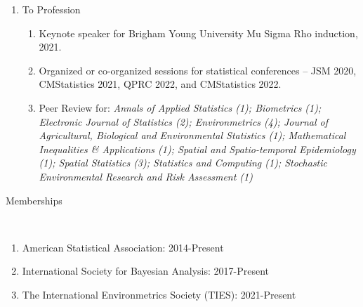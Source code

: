 \documentclass[11pt]{article}
\newcommand{\head}[1]{ %
    \bigskip %
    \begin{large}\begin{bf}{#1}\end{bf}\end{large} %

    \ \\ [-1.3cm] %

    \hrulefill}
\begin{document}
\begin{enumerate}[label=$\bullet$]
\begin{enumerate}[label=$\cdot$]
\end{enumerate}

\item To Profession



\begin{enumerate}[label=$\cdot$]
\item Keynote speaker for Brigham Young University Mu Sigma Rho induction, 2021.
\item Organized or co-organized sessions for statistical conferences -- JSM 2020, CMStatistics 2021, QPRC 2022, and CMStatistics 2022.
\item Peer Review for: \emph{Annals of Applied Statistics (1); Biometrics (1); Electronic Journal of Statistics (2); Environmetrics (4); Journal of Agricultural, Biological and Environmental Statistics (1); Mathematical Inequalities \& Applications (1); Spatial and Spatio-temporal Epidemiology (1); Spatial Statistics (3); Statistics and Computing (1); Stochastic Environmental Research and Risk Assessment (1) }


\end{enumerate}
\end{enumerate}

\head{Memberships}

\begin{enumerate}[label=$\bullet$]
\item American Statistical Association: 2014-Present
\item International Society for Bayesian Analysis: 2017-Present
\item The International Environmetrics Society (TIES): 2021-Present
\end{enumerate}
\end{document}
